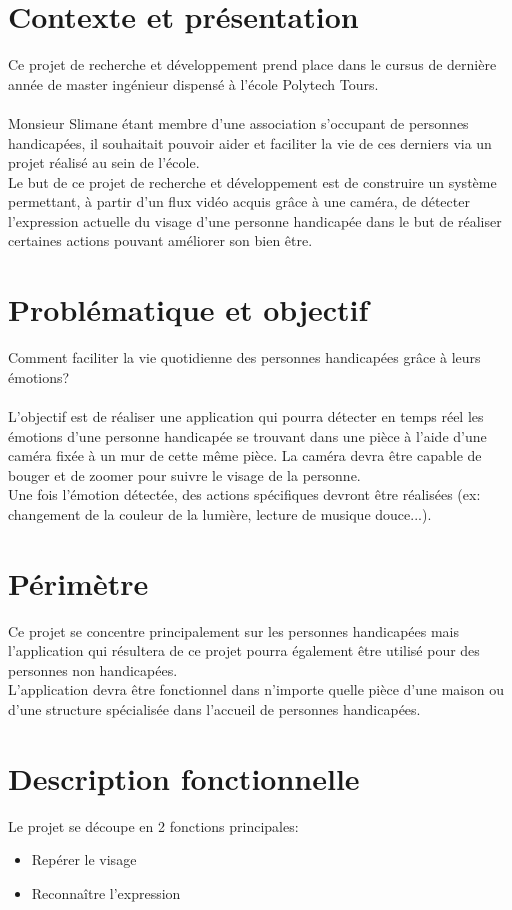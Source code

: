 \documentclass[poster]{polytech/polytech}
\begin{document}
\section{Contexte et présentation}
Ce projet de recherche et développement prend place dans le cursus de dernière année de master ingénieur dispensé à l'école Polytech Tours.\\
\\
Monsieur Slimane étant membre d'une association s'occupant de personnes handicapées, il souhaitait pouvoir aider et faciliter la vie de ces derniers via un projet réalisé au sein de l'école.\\
Le but de ce projet de recherche et développement est de construire un système permettant, à partir d'un flux vidéo acquis grâce à une caméra, de détecter l'expression actuelle du visage d'une personne handicapée dans le but de réaliser certaines actions pouvant améliorer son bien être.

\section{Problématique et objectif}
Comment faciliter la vie quotidienne des personnes handicapées grâce à leurs émotions?\\
\\
L'objectif est de réaliser une application qui pourra détecter en temps réel les émotions d'une personne handicapée se trouvant dans une pièce à l'aide d'une caméra fixée à un mur de cette même pièce. La caméra devra être capable de bouger et de zoomer pour suivre le visage de la personne.\\
Une fois l'émotion détectée, des actions spécifiques devront être réalisées (ex: changement de la couleur de la lumière, lecture de musique douce...).

\section{Périmètre}
Ce projet se concentre principalement sur les personnes handicapées mais l'application qui résultera de ce projet pourra également être utilisé pour des personnes non handicapées.\\
L'application devra être fonctionnel dans n'importe quelle pièce d'une maison ou d'une structure spécialisée dans l'accueil de personnes handicapées.

\section{Description fonctionnelle}
Le projet se découpe en 2 fonctions principales:
\begin{itemize}
\item Repérer le visage
\item Reconnaître l'expression\\
\end{itemize}
\end{document}
